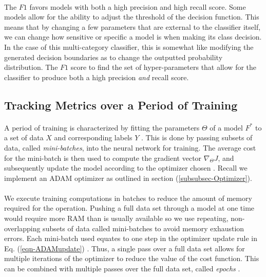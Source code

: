\documentclass[12pt,letterpaper]{article}
\begin{document}
\paragraph*{}The $F1$ favors models with both a high precision and high recall score. Some models allow for the ability to adjust the threshold of the decision function. This means that by changing a few parameters that are external to the classifier itself, we can change how sensitive or specific a model is when making its class decision. In the case of this multi-category classifier, this is somewhat like modifying the generated decision boundaries as to change the outputted probability distribution. The $F1$ score to find the set of hyper-parameters that allow for the classifier to produce both a high precision \textit{and} recall score.


\subsection{Tracking Metrics over a Period of Training}
\label{subsec-TrainingMetrics}

\paragraph*{}A period of training is characterized by fitting the parameters $\Theta$ of a model $F^*$ to a set of data $X$ and corresponding labels $Y$ \cite{Goodfellow,Virtanen}. This is done by passing subsets of data, called \textit{mini-batches}, into the neural network for training. The average cost for the mini-batch is then used to compute the gradient vector $\nabla_{\Theta}J$, and subsequently update the model according to the optimizer chosen \cite{Geron,Goodfellow}. Recall we implement an ADAM optimizer as outlined in section (\ref{subsubsec-Optimizer}).

\paragraph{}We execute training computations in batches to reduce the amount of memory required for the operation. Pushing a full data set through a model at one time would require more RAM than is usually available so we use repeating, non-overlapping subsets of data called mini-batches to avoid memory exhaustion errors. Each mini-batch used equates to one step in the optimizer update rule in Eq. (\ref{eqn-ADAMupdate}) \cite{Goodfellow}. Thus, a single pass over a full data set allows for multiple iterations of the optimizer to reduce the value of the cost function. This can be combined with multiple passes over the full data set, called \textit{epochs} \cite{James,Loy}.
\end{document}
